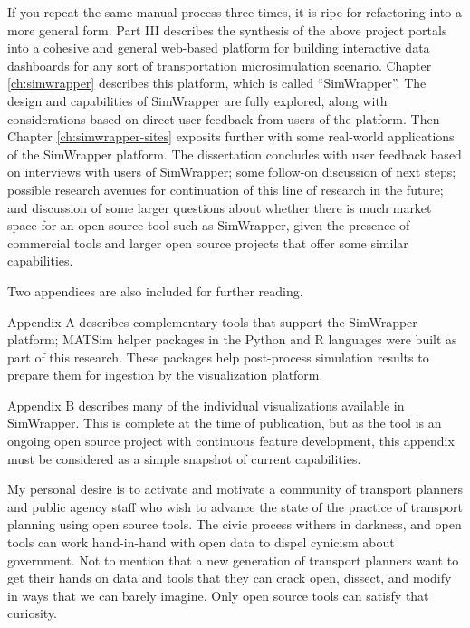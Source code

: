 If you repeat the same manual process three times, it is ripe for refactoring into a more general form. Part III describes the synthesis of the above project portals into a cohesive and general web-based platform for building interactive data dashboards for any sort of transportation microsimulation scenario. Chapter \ref{ch:simwrapper} describes this platform, which is called ``SimWrapper''. The design and capabilities of SimWrapper are fully explored, along with considerations based on direct user feedback from users of the platform. Then Chapter \ref{ch:simwrapper-sites} exposits further with some real-world applications of the SimWrapper platform. The dissertation concludes with user feedback based on interviews with users of SimWrapper; some follow-on discussion of next steps; possible research avenues for continuation of this line of research in the future; and discussion of some larger questions about whether there is much market space for an open source tool such as SimWrapper, given the presence of commercial tools and larger open source projects that offer some similar capabilities.

Two appendices are also included for further reading.

Appendix A describes complementary tools that support the SimWrapper platform; MATSim helper packages in the Python and R languages were built as part of this research. These packages help post-process simulation results to prepare them for ingestion by the visualization platform.

Appendix B describes many of the individual visualizations available in SimWrapper. This is complete at the time of publication, but as the tool is an ongoing open source project with continuous feature development, this appendix must be considered as a simple snapshot of current capabilities.

My personal desire is to activate and motivate a community of transport planners and public agency staff who wish to advance the state of the practice of transport planning using open source tools. The civic process withers in darkness, and open tools can work hand-in-hand with open data to dispel cynicism about government. Not to mention that a new generation of transport planners want to get their hands on data and tools that they can crack open, dissect, and modify in ways that we can barely imagine. Only open source tools can satisfy that curiosity.
